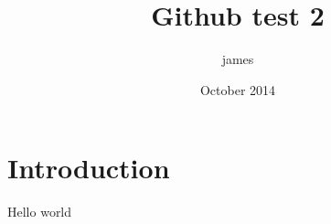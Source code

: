 \documentclass{article}
\title{Github test 2}
\author{james }
\date{October 2014}
\begin{document}
\maketitle

\section{Introduction}

Hello world
\end{document}

